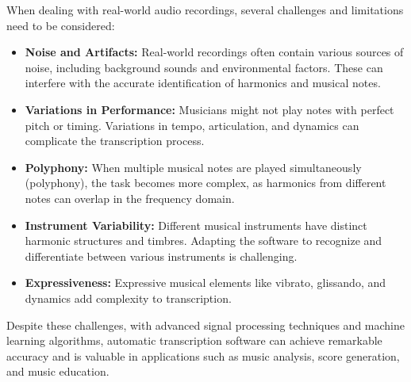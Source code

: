 \documentclass[11pt]{article}
\begin{document}
When dealing with real-world audio recordings, several challenges and
limitations need to be considered:

\begin{itemize}
\item
  \textbf{Noise and Artifacts:} Real-world recordings often contain
  various sources of noise, including background sounds and
  environmental factors. These can interfere with the accurate
  identification of harmonics and musical notes.
\item
  \textbf{Variations in Performance:} Musicians might not play notes
  with perfect pitch or timing. Variations in tempo, articulation, and
  dynamics can complicate the transcription process.
\item
  \textbf{Polyphony:} When multiple musical notes are played
  simultaneously (polyphony), the task becomes more complex, as
  harmonics from different notes can overlap in the frequency domain.
\item
  \textbf{Instrument Variability:} Different musical instruments have
  distinct harmonic structures and timbres. Adapting the software to
  recognize and differentiate between various instruments is
  challenging.
\item
  \textbf{Expressiveness:} Expressive musical elements like vibrato,
  glissando, and dynamics add complexity to transcription.
\end{itemize}

Despite these challenges, with advanced signal processing techniques and
machine learning algorithms, automatic transcription software can
achieve remarkable accuracy and is valuable in applications such as
music analysis, score generation, and music education.


    
    
    
\end{document}
